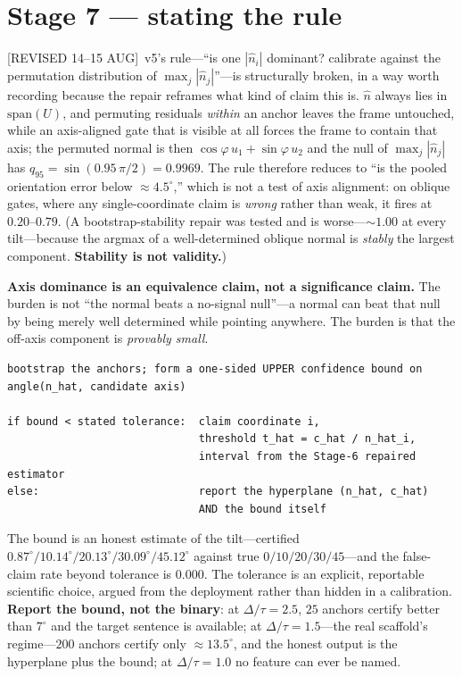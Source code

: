\documentclass[11pt]{article}
\newcommand{\nhat}{\hat{n}}
\newcommand{\provtag}[2]{{\footnotesize\sffamily\textcolor{#1}{[#2]}}}
\newcommand{\REVI}{\provtag{openamber}{REVISED 14--15 AUG}}
\begin{document}
\section{Stage 7 --- stating the rule}
\label{sec:stage7}

\REVI\ v5's rule---``is one $|\nhat_i|$ dominant? calibrate against the permutation distribution
of $\max_j |\nhat_j|$''---is structurally broken, in a way worth recording because the repair
reframes what kind of claim this is. $\nhat$ always lies in $\mathrm{span}(U)$, and permuting
residuals \emph{within} an anchor leaves the frame untouched, while an axis-aligned gate that is
visible at all forces the frame to contain that axis; the permuted normal is then
$\cos\varphi\,u_1 + \sin\varphi\,u_2$ and the null of $\max_j|\nhat_j|$ has
$q_{95} = \sin(0.95\,\pi/2) = 0.9969$. The rule therefore reduces to ``is the pooled orientation
error below ${\approx}4.5^\circ$,'' which is not a test of axis alignment: on oblique gates,
where any single-coordinate claim is \emph{wrong} rather than weak, it fires at
$0.20$--$0.79$. (A bootstrap-stability repair was tested and is worse---${\sim}1.00$ at every
tilt---because the argmax of a well-determined oblique normal is \emph{stably} the largest
component. \textbf{Stability is not validity.})

\begin{claimbox}
\noindent\textbf{Axis dominance is an equivalence claim, not a significance claim.} The burden
is not ``the normal beats a no-signal null''---a normal can beat that null by being merely well
determined while pointing anywhere. The burden is that the off-axis component is
\emph{provably small}.
\end{claimbox}

\begin{codebox}
\begin{verbatim}
bootstrap the anchors; form a one-sided UPPER confidence bound on
angle(n_hat, candidate axis)

if bound < stated tolerance:  claim coordinate i,
                              threshold t_hat = c_hat / n_hat_i,
                              interval from the Stage-6 repaired estimator
else:                         report the hyperplane (n_hat, c_hat)
                              AND the bound itself
\end{verbatim}
\end{codebox}

\noindent The bound is an honest estimate of the tilt---certified $0.87^\circ / 10.14^\circ /
20.13^\circ / 30.09^\circ / 45.12^\circ$ against true $0 / 10 / 20 / 30 / 45$---and the
false-claim rate beyond tolerance is $0.000$. The tolerance is an explicit, reportable
scientific choice, argued from the deployment rather than hidden in a calibration. \textbf{Report
the bound, not the binary}: at $\Delta/\tau = 2.5$, $25$ anchors certify better than $7^\circ$
and the target sentence is available; at $\Delta/\tau = 1.5$---the real scaffold's
regime---$200$ anchors certify only ${\approx}13.5^\circ$, and the honest output is the
hyperplane plus the bound; at $\Delta/\tau = 1.0$ no feature can ever be named.
\end{document}
